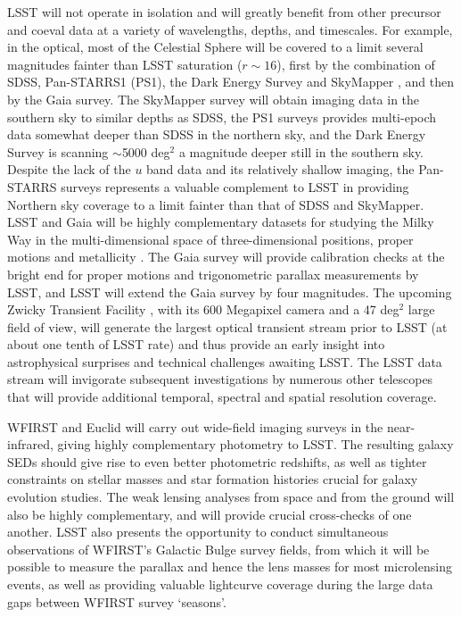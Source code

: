 LSST will not operate in isolation and will greatly benefit from other precursor and coeval
data at a variety of wavelengths, depths, and timescales. For example,
in the optical, most of the Celestial
Sphere will be covered to a limit several magnitudes fainter than LSST saturation
($r\sim16$), first by the combination of SDSS, Pan-STARRS1 (PS1), the
Dark Energy Survey \citep{2016MNRAS.460.1270D} and SkyMapper
\citep{2007PASA...24....1K},
and then by the Gaia survey. The SkyMapper survey will obtain imaging data in the southern
sky to similar depths as SDSS, the PS1 surveys provides multi-epoch
data somewhat deeper
than SDSS in the northern sky, and the Dark Energy Survey
 is scanning
$\sim$5000 deg$^2$ a magnitude deeper still in the southern sky. Despite the lack of
the $u$ band data and its relatively shallow imaging, the Pan-STARRS surveys
represents a valuable complement to LSST in providing Northern sky coverage to a limit
fainter than that of SDSS and SkyMapper. LSST and Gaia will
be highly complementary datasets for studying the Milky Way in the multi-dimensional space of
three-dimensional positions, proper motions and metallicity \citep{2012ARA&A..50..251I}.
The Gaia survey will provide calibration checks at the bright end for proper
motions and trigonometric parallax measurements by LSST, and LSST will extend the
Gaia survey by four magnitudes. The upcoming Zwicky Transient Facility \cite[e.g.,][]{2017arXiv170801584L},
with its 600 Megapixel camera and a 47 deg$^2$ large field of view, will generate the largest
optical transient stream prior to LSST (at about one tenth of LSST rate) and thus provide
an early insight into astrophysical surprises and technical challenges awaiting LSST.
The LSST data stream will invigorate subsequent investigations by numerous other telescopes
that will provide additional temporal, spectral and spatial resolution coverage.

WFIRST and Euclid will carry out wide-field imaging surveys in the
near-infrared, giving highly complementary photometry to LSST.  The
resulting galaxy SEDs should give rise to even better photometric
redshifts, as well as tighter constraints on stellar masses and star
formation histories crucial for galaxy evolution studies.  The weak
lensing analyses from space and from the ground will also be highly
complementary, and will provide crucial cross-checks of one another.
LSST also presents the opportunity to conduct simultaneous observations
of WFIRST's Galactic Bulge survey fields, from which it will be possible to
measure the parallax and hence the lens masses for most microlensing
events, as well as providing valuable lightcurve coverage during the large
data gaps between WFIRST survey `seasons'.

